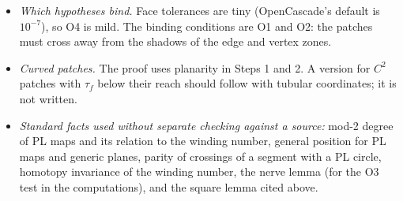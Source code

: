 \begin{remark}
\begin{itemize}
\item \emph{Which hypotheses bind.} Face tolerances are tiny (OpenCascade's default is $10^{-7}$), so O4 is mild.
The binding conditions are O1 and O2: the patches must cross away from the shadows of the edge and vertex zones.
\item \emph{Curved patches.} The proof uses planarity in Steps 1 and 2. A version for $C^2$ patches with $\tau_f$
below their reach should follow with tubular coordinates; it is not written.
\item \emph{Standard facts used without separate checking against a source:} mod-2 degree of PL maps and its relation
to the winding number, general position for PL maps and generic planes, parity of crossings of a segment with a PL
circle, homotopy invariance of the winding number, the nerve lemma (for the O3 test in the computations), and the
square lemma cited above.
\end{itemize}
\end{remark}
